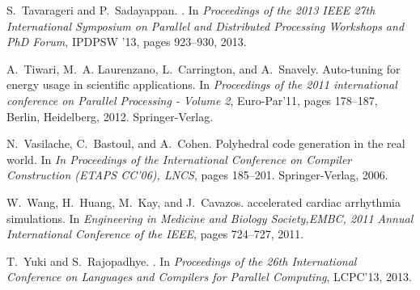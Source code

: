 \documentclass{sig-alternate}
\begin{document}
\begin{thebibliography}{10}
S.~Tavarageri and P.~Sadayappan.                                                 
.                                                                   
\newblock In {\em Proceedings of the 2013 IEEE 27th International Symposium on   
  Parallel and Distributed Processing Workshops and PhD Forum}, IPDPSW '13,      
  pages 923--930, 2013.                                                          
                                                                                 
A.~Tiwari, M.~A. Laurenzano, L.~Carrington, and A.~Snavely.                      
\newblock Auto-tuning for energy usage in scientific applications.               
\newblock In {\em Proceedings of the 2011 international conference on Parallel   
  Processing - Volume 2}, Euro-Par'11, pages 178--187, Berlin, Heidelberg,       
  2012. Springer-Verlag.                                                         
                                                                                 
N.~Vasilache, C.~Bastoul, and A.~Cohen.                                          
\newblock Polyhedral code generation in the real world.                          
\newblock In {\em In Proceedings of the International Conference on Compiler     
  Construction (ETAPS CC'06), LNCS}, pages 185--201. Springer-Verlag, 2006.      
                                                                                 
W.~Wang, H.~Huang, M.~Kay, and J.~Cavazos.                                       
 accelerated cardiac arrhythmia simulations.                    
\newblock In {\em Engineering in Medicine and Biology Society,EMBC, 2011 Annual  
  International Conference of the IEEE}, pages 724--727, 2011.                   
                                                                
T.~Yuki and S.~Rajopadhye.                                                       
.      
\newblock In {\em Proceedings of the 26th International Conference on Languages  
  and Compilers for Parallel Computing}, LCPC'13, 2013.                          
                                                                                 
\end{thebibliography}   


\end{document}

